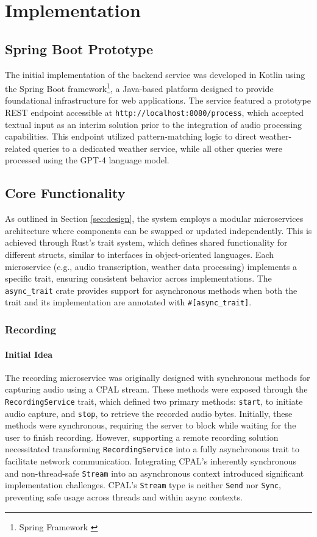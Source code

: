 \renewcommand*\chapterpagestyle{scrheadings}
\chapter{Implementation}

\section{Spring Boot Prototype}
The initial implementation of the backend service was developed in Kotlin using the Spring Boot framework\footnote{Spring Framework \cite{spring}},
a Java-based platform designed to provide foundational infrastructure for web applications.
The service featured a prototype REST endpoint accessible at \texttt{http://localhost:8080/process},
which accepted textual input as an interim solution prior to the integration of audio processing capabilities.
This endpoint utilized pattern-matching logic to direct weather-related queries to a dedicated weather service,
while all other queries were processed using the GPT-4 language model.

\section{Core Functionality}
As outlined in Section \ref{sec:design}, the system employs a modular microservices architecture where components can be swapped or updated independently.
This is achieved through Rust's trait system, which defines shared functionality for different structs, similar to interfaces in object-oriented languages.
Each microservice (e.g., audio transcription, weather data processing) implements a specific trait, ensuring consistent behavior across implementations.
The \texttt{async\_trait} crate provides support for asynchronous methods when both the trait and its implementation are annotated with \texttt{\#[async\_trait]}.

\subsection{Recording}

\subsubsection{Initial Idea}
The recording microservice was originally designed with synchronous methods for capturing audio using a CPAL stream.
These methods were exposed through the \texttt{RecordingService} trait, which defined two primary methods: \texttt{start},
to initiate audio capture, and \texttt{stop}, to retrieve the recorded audio bytes.
Initially, these methods were synchronous, requiring the server to block while waiting for the user to finish recording.
However, supporting a remote recording solution necessitated transforming \texttt{RecordingService} into a fully asynchronous trait to facilitate network communication.
Integrating CPAL's inherently synchronous and non-thread-safe \texttt{Stream} into an asynchronous context introduced significant implementation challenges.
CPAL's \texttt{Stream} type is neither \texttt{Send} nor \texttt{Sync}, preventing safe usage across threads and within async contexts.

